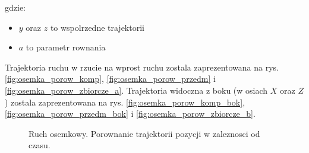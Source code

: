 gdzie:
\begin{itemize}
	\item $y$ oraz $z$ to wspolrzedne trajektorii
	\item $a$ to parametr rownania
\end{itemize}

Trajektoria ruchu w rzucie na wprost ruchu zostala zaprezentowana na rys. \ref{fig:osemka_porow_komp}, \ref{fig:osemka_porow_przedm} i \ref{fig:osemka_porow_zbiorcze_a}. Trajektoria widoczna z boku (w osiach $X$ oraz $Z$) zostala zaprezentowana na rys. \ref{fig:osemka_porow_komp_bok}, \ref{fig:osemka_porow_przedm_bok} i \ref{fig:osemka_porow_zbiorcze_b}.
\begin{figure}[h]
	\centering
	\hfill
	
	\hfill

	\caption{Ruch osemkowy. Porownanie trajektorii pozycji w zaleznosci od czasu.}
	\label{fig:osemka_a}

\end{figure}


